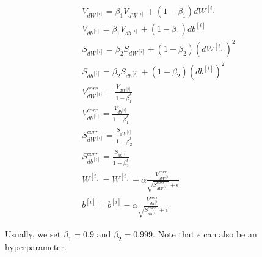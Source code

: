 	\begin{align}
		V_{dW^{[i]}} = \beta_1 V_{dW^{[i]}} + (1-\beta_1) dW^{[i]}\\
		V_{db^{[i]}} = \beta_1 V_{db^{[i]}} + (1-\beta_1) db^{[i]}\\
		S_{dW^{[i]}} = \beta_2 S_{dW^{[i]}} + (1-\beta_2) (dW^{[i]})^2\\
		S_{db^{[i]}} = \beta_2 S_{db^{[i]}} + (1-\beta_2) (db^{[i]})^2\\
		V_{dW^{[i]}}^{corr} = \frac{V_{dW^{[i]}}}{1 - \beta_1^t} \\ 
		V_{db^{[i]}}^{corr} = \frac{V_{db^{[i]}}}{1 - \beta_1^t} \\ 
		S_{dW^{[i]}}^{corr} = \frac{S_{dW^{[i]}}}{1 - \beta_2^t} \\
		S_{db^{[i]}}^{corr} = \frac{S_{db^{[i]}}}{1 - \beta_2^t} \\
		W^{[i]} = W^{[i]} - \alpha \frac{V_{dW^{[i]}}^{corr} }{\sqrt{S_{dW^{[i]}}^{corr} }+\epsilon} \\
		b^{[i]} = b^{[i]} - \alpha \frac{V_{db^{[i]}}^{corr} }{\sqrt{S_{db^{[i]}}^{corr} }+\epsilon} 
	\end{align}
	
	Usually, we set $\beta_1=0.9$ and $\beta_2=0.999$.
	Note that $\epsilon$ can also be an hyperparameter.